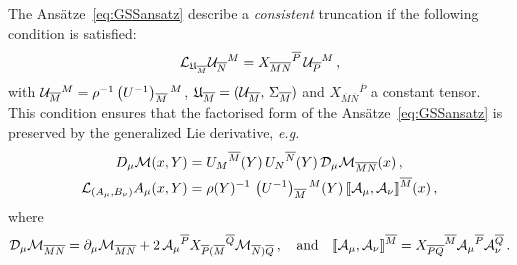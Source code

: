 \documentclass[a4paper, 11pt]{article}
\numberwithin{equation}{section}
\newcommand{\ff}[1]{\mathfrak{#1}}
\newcommand{\ov}[1]{\overline{#1}}
\newcommand{\+}{\oplus}
\newcommand{\gL}{\mathcal{L}}
\newcommand{\cU}{{\cal U}}
\newcommand{\UI}{\left(U^{-1}\right)}
\newcommand{\fl}[1]{\ov{#1}}
\newcommand{\M}{\ensuremath{\mathcal{M}}\xspace}
\newcommand{\A}{\ensuremath{\mathcal{A}}\xspace}
\begin{document}
The Ansätze~\eqref{eq:GSSansatz} describe a \textit{consistent} truncation if the following condition is satisfied:
\begin{equation} \label{eq:GenLeibniz}
	\gL_{\ff{U}_{\fl{M}}} {\cU}_{\fl{N}}{}^M = X_{\fl{M}\fl{N}}{}^{\fl{P}}\, \cU_{\fl{P}}{}^M\,,
\end{equation}
with $\cU_{\fl{M}}{}^M = \rho^{-1} \UI_{\fl{M}}{}^M$, $\ff{U}_{\fl{M}} = (\cU_{\fl{M}},\,\Sigma_{\fl{M}})$ and $X_{\fl{M}\fl{N}}{}^{\fl{P}}$ a constant tensor. This condition ensures that the factorised form of the Ansätze~\eqref{eq:GSSansatz} is preserved by the generalized Lie derivative, \textit{e.g.}
\begin{equation} \label{eq:GSSexample}
	\begin{split}
		D_{\mu}\M(x,Y) &= U_{M}{}^{\fl{M}}(Y)\,U_{N}{}^{\fl{N}}(Y)\,{\cal D}_{\mu}\M_{\fl{MN}}(x)\,,\\
		{\cal L}_{(A_{\mu},B_{\nu})}A_{\mu}(x,Y) &= \rho(Y)^{-1}\,\UI_{\fl{M}}{}^{M}(Y)\,\llbracket\A_{\mu},\A_{\nu}\rrbracket^{\fl{M}}(x)\,,
	\end{split}
\end{equation}
where 
\begin{equation} \label{eq:3dCovDeriv}
	{\cal D}_{\mu}\M_{\fl{MN}} = \partial_{\mu}\M_{\fl{MN}} + 2\,\A_{\mu}{}^{\fl{P}}X_{\fl{P}(\fl{M}}{}^{\fl{Q}}\M_{\fl{N})\fl{Q}}\,, \quad {\rm and} \quad \llbracket\A_{\mu},\A_{\nu}\rrbracket^{\fl{M}}=X_{\fl{PQ}}{}^{\fl{M}}\A_{\mu}{}^{\fl{P}}\A_{\nu}^{\fl{Q}} \,.
\end{equation}
\end{document}

